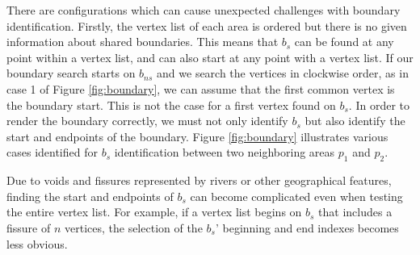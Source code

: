 There are configurations which can cause unexpected challenges with boundary identification. Firstly, the vertex list of each area is ordered but there is no given information about shared boundaries. This means that $b_{s}$ can be found at any point within a vertex list, and can also start at any point with a vertex list. If our boundary search starts on $b_{ns}$ and we search the vertices in clockwise order, as in case 1 of Figure \ref{fig:boundary}, we can assume that the first common vertex is the boundary start. This is not the case for a first vertex found on $b_{s}$. In order to render the boundary correctly, we must not only identify $b_{s}$ but also identify the start and endpoints of the boundary. Figure \ref{fig:boundary} illustrates various cases identified for $b_{s}$ identification between two neighboring areas $p_1$ and $p_2$. 

Due to voids and fissures represented by rivers or other geographical features, finding the start and endpoints of $b_{s}$ can become complicated even when testing the entire vertex list. For example, if a vertex list begins on $b_{s}$ that includes a fissure of $n$ vertices, the selection of the $b_{s}$' beginning and end indexes becomes less obvious.

